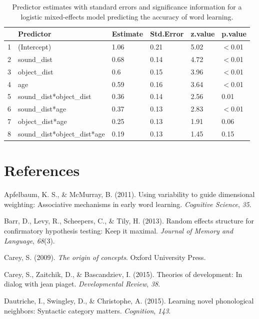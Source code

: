 \documentclass[english,,man,floatsintext]{apa6}
\theoremstyle{definition}
\theoremstyle{definition}
\theoremstyle{definition}
\theoremstyle{remark}
\begin{document}
\begin{table}[ht]
\centering
\begin{tabular}{rlllll}
  \hline
 & Predictor & Estimate & Std.Error & z.value & p.value \\ 
  \hline
1 & (Intercept) & 1.06 & 0.21 & 5.02 & $<$0.01 \\ 
  2 & sound\_dist & 0.68 & 0.14 & 4.72 & $<$0.01 \\ 
  3 & object\_dist & 0.6 & 0.15 & 3.96 & $<$0.01 \\ 
  4 & age & 0.59 & 0.16 & 3.64 & $<$0.01 \\ 
  5 & sound\_dist*object\_dist & 0.36 & 0.14 & 2.56 & 0.01 \\ 
  6 & sound\_dist*age & 0.37 & 0.13 & 2.83 & $<$0.01 \\ 
  7 & object\_dist*age & 0.25 & 0.13 & 1.91 & 0.06 \\ 
  8 & sound\_dist*object\_dist*age & 0.19 & 0.13 & 1.45 & 0.15 \\ 
   \hline
\end{tabular}
\caption{Predictor estimates with standard errors and significance information for a logistic mixed-effects model predicting the accuracy of word learning.} 
\end{table}

\section{References}\label{references}

\setlength{\parindent}{-0.5in} \setlength{\leftskip}{0.5in}

\hypertarget{refs}{}
\hypertarget{ref-apfelbaum2011}{}
Apfelbaum, K. S., \& McMurray, B. (2011). Using variability to guide
dimensional weighting: Associative mechanisms in early word learning.
\emph{Cognitive Science}, \emph{35}.

\hypertarget{ref-barr2013}{}
Barr, D., Levy, R., Scheepers, C., \& Tily, H. (2013). Random effects
structure for confirmatory hypothesis testing: Keep it maximal.
\emph{Journal of Memory and Language}, \emph{68}(3).

\hypertarget{ref-carey2009}{}
Carey, S. (2009). \emph{The origin of concepts}. Oxford University
Press.

\hypertarget{ref-carey2015}{}
Carey, S., Zaitchik, D., \& Bascandziev, I. (2015). Theories of
development: In dialog with jean piaget. \emph{Developmental Review},
\emph{38}.

\hypertarget{ref-dautriche2015}{}
Dautriche, I., Swingley, D., \& Christophe, A. (2015). Learning novel
phonological neighbors: Syntactic category matters. \emph{Cognition},
\emph{143}.
\end{document}
